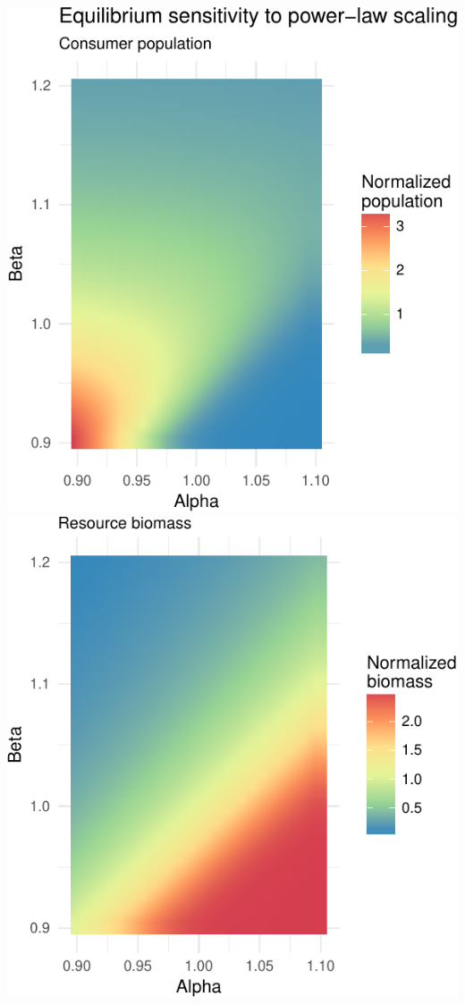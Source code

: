 \documentclass[]{article}
\begin{document}
\includegraphics[width=1\linewidth]{eq_pop_files/figure-latex/unnamed-chunk-6-1}
\includegraphics[width=1\linewidth]{eq_pop_files/figure-latex/unnamed-chunk-6-2}
\end{document}
